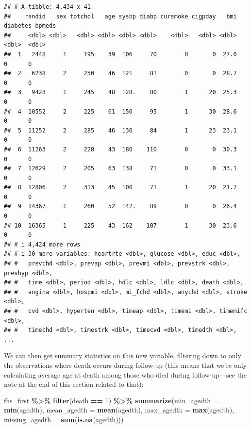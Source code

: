 \documentclass[
]{book}
\newenvironment{Shaded}{\begin{snugshade}}{\end{snugshade}}
\newcommand{\AttributeTok}[1]{\textcolor[rgb]{0.13,0.29,0.53}{#1}}
\newcommand{\DecValTok}[1]{\textcolor[rgb]{0.00,0.00,0.81}{#1}}
\newcommand{\FunctionTok}[1]{\textcolor[rgb]{0.13,0.29,0.53}{\textbf{#1}}}
\newcommand{\NormalTok}[1]{#1}
\newcommand{\SpecialCharTok}[1]{\textcolor[rgb]{0.81,0.36,0.00}{\textbf{#1}}}
\begin{document}
\begin{verbatim}
## # A tibble: 4,434 x 41
##    randid   sex totchol   age sysbp diabp cursmoke cigpday   bmi diabetes bpmeds
##     <dbl> <dbl>   <dbl> <dbl> <dbl> <dbl>    <dbl>   <dbl> <dbl>    <dbl>  <dbl>
##  1   2448     1     195    39  106     70        0       0  27.0        0      0
##  2   6238     2     250    46  121     81        0       0  28.7        0      0
##  3   9428     1     245    48  128.    80        1      20  25.3        0      0
##  4  10552     2     225    61  150     95        1      30  28.6        0      0
##  5  11252     2     285    46  130     84        1      23  23.1        0      0
##  6  11263     2     228    43  180    110        0       0  30.3        0      0
##  7  12629     2     205    63  138     71        0       0  33.1        0      0
##  8  12806     2     313    45  100     71        1      20  21.7        0      0
##  9  14367     1     260    52  142.    89        0       0  26.4        0      0
## 10  16365     1     225    43  162    107        1      30  23.6        0      0
## # i 4,424 more rows
## # i 30 more variables: heartrte <dbl>, glucose <dbl>, educ <dbl>,
## #   prevchd <dbl>, prevap <dbl>, prevmi <dbl>, prevstrk <dbl>, prevhyp <dbl>,
## #   time <dbl>, period <dbl>, hdlc <dbl>, ldlc <dbl>, death <dbl>,
## #   angina <dbl>, hospmi <dbl>, mi_fchd <dbl>, anychd <dbl>, stroke <dbl>,
## #   cvd <dbl>, hyperten <dbl>, timeap <dbl>, timemi <dbl>, timemifc <dbl>,
## #   timechd <dbl>, timestrk <dbl>, timecvd <dbl>, timedth <dbl>, ...
\end{verbatim}

We can then get summary statistics on this new variable, filtering down to only the observations where death occurs during follow-up (this means that we're only calculating average age at death among those who died during follow-up---see the note at the end of this section related to that):

\begin{Shaded}
\begin{Highlighting}[]
\NormalTok{fhs\_first }\SpecialCharTok{\%\textgreater{}\%} 
  \FunctionTok{filter}\NormalTok{(death }\SpecialCharTok{==} \DecValTok{1}\NormalTok{) }\SpecialCharTok{\%\textgreater{}\%} 
  \FunctionTok{summarize}\NormalTok{(}\AttributeTok{min\_agedth =} \FunctionTok{min}\NormalTok{(agedth),}
            \AttributeTok{mean\_agedth =} \FunctionTok{mean}\NormalTok{(agedth),}
            \AttributeTok{max\_agedth =} \FunctionTok{max}\NormalTok{(agedth),}
            \AttributeTok{missing\_agedth =} \FunctionTok{sum}\NormalTok{(}\FunctionTok{is.na}\NormalTok{(agedth)))}
\end{Highlighting}
\end{Shaded}
\end{document}
